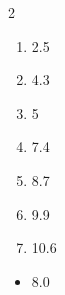 \documentclass[\mainfilename]{subfiles}
\begin{document}
\begin{questionBox}2{}
    
    \begin{multicols}{2}

        \begin{enumerate}
            \item 2.5
            \item 4.3
            \item 5
            \item 7.4
            \item 8.7
            \item 9.9
            \item 10.6
        \end{enumerate}
        
    \end{multicols}

    \begin{itemize}
        \item 8.0
    \end{itemize}
        
            

\end{questionBox}
\end{document}

